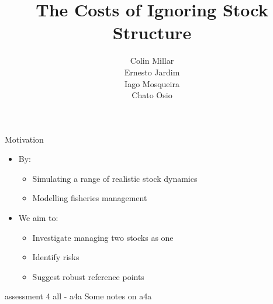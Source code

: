 \documentclass{beamer}
\title{The Costs of Ignoring Stock Structure}
\author{Colin Millar\\Ernesto Jardim\\Iago Mosqueira\\Chato Osio}
\institute{European Commission\\ Joint Research Center}
\begin{document}



\begin{frame}
\titlepage
\end{frame}


\begin{withoutheadline}
\begin{frame}{Motivation}

  \begin{itemize}
    \item By:
    \begin{itemize}
      \item Simulating a range of realistic stock dynamics
      \item Modelling fisheries management
    \end{itemize}
    \item We aim to:
    \begin{itemize}
      \item Investigate managing two stocks as one
      \item Identify risks
      \item Suggest robust reference points
    \end{itemize}
  \end{itemize}
\end{frame}
\end{withoutheadline}


\begin{withoutheadline}
\begin{frame}{assessment 4 all - a4a}
  Some notes on a4a  
\end{frame}
\end{withoutheadline}

\end{document}
